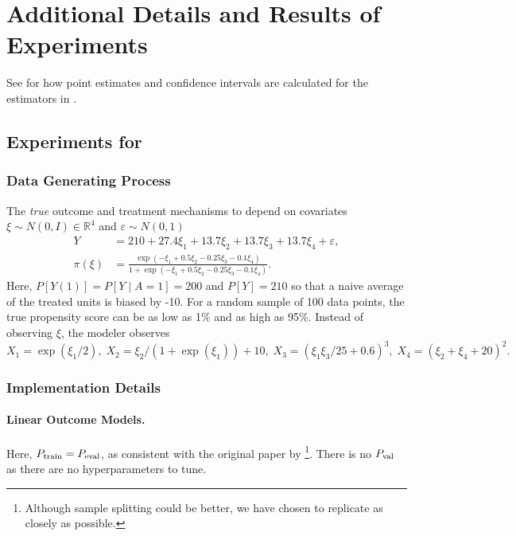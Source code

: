 \section{Additional Details and Results of Experiments}
\label{sec:exp_details}
\ifdefined\msom\else See  for how point estimates and confidence intervals are calculated for the estimators in . 
\fi

\subsection{Experiments for \citet{KangSc07}}
\ifdefined\pnas
\subsubsection{Data Generating Process}
\label{sec:ks_dgp}
The \textit{true} outcome and treatment  mechanisms to depend on covariates $\xi \sim N(0, I) \in \mathbb R^4$ and $\varepsilon\sim N(0,1)$
\begin{align*}
Y & = 210 + 27.4 \xi_{1} + 13.7 \xi_{2} + 13.7 \xi_{3} + 13.7 \xi_{4} + \varepsilon, \\
\pi(\xi) & = \frac{\exp(-\xi_{1} + 0.5 \xi_{2} - 0.25 \xi_{3} - 0.1 \xi_{4})}{1+\exp(-\xi_{1} + 0.5 \xi_{2} - 0.25 \xi_{3} - 0.1 \xi_{4})}.
\end{align*}
Here, $P[Y(1)]=P[Y\mid A = 1] = 200$ and $P[Y] = 210$ so that a naive average of the treated units is biased by -10. For a random sample of 100 data points, the true propensity score can be as low as 1\% and as high as 95\%. Instead of observing $\xi$, the modeler observes
$$
X_{1} = \exp(\xi_{1}/2),\;X_{2} = \xi_{2}/(1+\exp(\xi_{1})) + 10,\;X_{3} = (\xi_{1}\xi_{3}/25 + 0.6)^3,\;X_{4} = (\xi_{2} + \xi_{4} + 20)^2.
$$
\else\fi
\subsubsection{Implementation Details}
\label{sec:ks_experiment_details}

\paragraph{Linear Outcome Models.} Here, $P_{\rm train}=P_{\rm eval}$, as consistent with the original paper by \citet{KangSc07}\footnote{Although sample splitting could be better, we have chosen to replicate \cite{KangSc07} as closely as possible.}. There is no $P_{\rm val}$ as there are no hyperparameters to tune. 

